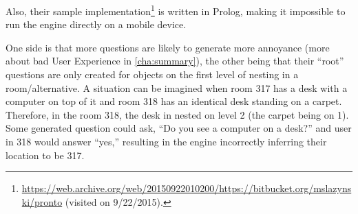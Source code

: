 Also, their sample implementation\footnote{\url{https://web.archive.org/web/20150922010200/https://bitbucket.org/mslazynski/pronto} (visited on 9/22/2015).} is written in Prolog, making it impossible to run the engine directly on a mobile device.

One side is that more questions are likely to generate more annoyance (more about bad User Experience in \cref{cha:summary}), the other being that their ``root'' questions are only created for objects on the first level of nesting in a room/alternative. A situation can be imagined when room 317 has a desk with a computer on top of it and room 318 has an identical desk standing on a carpet. Therefore, in the room 318, the desk in nested on level 2 (the carpet being on 1). Some generated question could ask, ``Do you see a computer on a desk?'' and user in 318 would answer ``yes,'' resulting in the engine incorrectly inferring their location to be 317.

